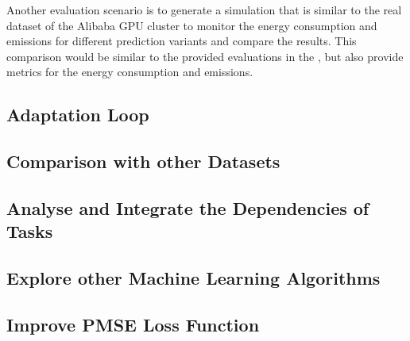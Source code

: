             Another evaluation scenario is to generate a simulation that is similar to the real dataset of the Alibaba GPU cluster to monitor the energy consumption and \COTWO emissions for different prediction variants and compare the results.
            This comparison would be similar to the provided evaluations in the , but also provide metrics for the energy consumption and \COTWO emissions.


        \subsection{Adaptation Loop}
        \label{sec:adaptation-loop-future-work}


        \subsection{Comparison with other Datasets}
        \label{sec:comparison-with-other-datasets-future-work}


        \subsection{Analyse and Integrate the Dependencies of Tasks}
        \label{sec:analyse-and-integrate-the-dependencies-of-tasks-future-work}


        \subsection{Explore other Machine Learning Algorithms}
        \label{sec:explore-other-machine-learning-algorithms-future-work}


        \subsection{Improve PMSE Loss Function}
        \label{sec:improve-pmse-loss-function-future-work}

